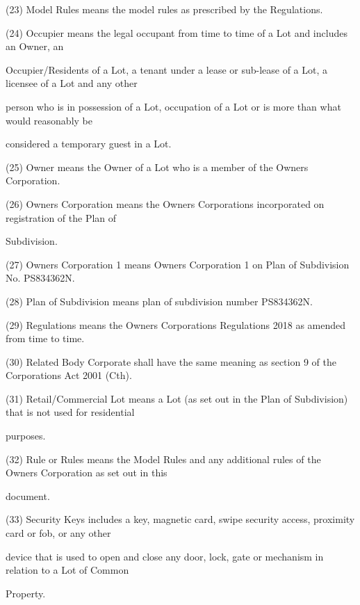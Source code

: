 \documentclass{article}
\begin{document}
{\fontsize{9.962}{1}(23) Model Rules means the model rules as prescribed by the Regulations. }

{\fontsize{9.962}{1}(24) Occupier means the legal occupant from time to time of a Lot and includes an Owner, an }

{\fontsize{10.02}{1}Occupier/Residents of a Lot, a tenant under a lease or sub-lease of a Lot, a licensee of a Lot and any other }

{\fontsize{10.02}{1}person who is in possession of a Lot, occupation of a Lot or is more than what would reasonably be }

{\fontsize{10.02}{1}considered a temporary guest in a Lot. }

{\fontsize{9.962}{1}(25) Owner means the Owner of a Lot who is a member of the Owners Corporation. }

{\fontsize{9.962}{1}(26) Owners Corporation means the Owners Corporations incorporated on registration of the Plan of }

{\fontsize{10.02}{1}Subdivision. }

{\fontsize{9.962}{1}(27) Owners Corporation 1 means Owners Corporation 1 on Plan of Subdivision No. PS834362N. }

{\fontsize{9.962}{1}(28) Plan of Subdivision means plan of subdivision number PS834362N. }

{\fontsize{9.962}{1}(29) Regulations means the Owners Corporations Regulations 2018 as amended from time to time. }

{\fontsize{9.962}{1}(30) Related Body Corporate shall have the same meaning as section 9 of the Corporations Act 2001 (Cth). }

{\fontsize{9.962}{1}(31) Retail/Commercial Lot means a Lot (as set out in the Plan of Subdivision) that is not used for residential }

{\fontsize{10.02}{1}purposes. }

{\fontsize{9.962}{1}(32) Rule or Rules means the Model Rules and any additional rules of the Owners Corporation as set out in this }

{\fontsize{10.02}{1}document. }

{\fontsize{9.962}{1}(33) Security Keys includes a key, magnetic card, swipe security access, proximity card or fob, or any other }

{\fontsize{10.02}{1}device that is used to open and close any door, lock, gate or mechanism in relation to a Lot of Common }

{\fontsize{10.02}{1}Property. }
\end{document}

